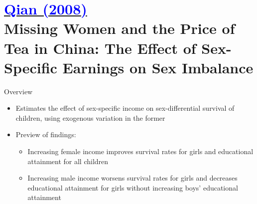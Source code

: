 \documentclass[11pt,notes=hide,aspectratio=169,mathserif]{beamer}
\begin{document}
\section*{\href{https://watermark.silverchair.com/123-3-1251.pdf?token=AQECAHi208BE49Ooan9kkhW_Ercy7Dm3ZL_9Cf3qfKAc485ysgAAA4MwggN_BgkqhkiG9w0BBwagggNwMIIDbAIBADCCA2UGCSqGSIb3DQEHATAeBglghkgBZQMEAS4wEQQM5oexR9-ezy51iFcTAgEQgIIDNvXO_WEQ2i7wsuSyrFh78JdyLp-nxQ69jjhzdxGYP3-y7cWm9HCEibHmZCw5vYxLPyLgMuYsZ4-LxYgQdiYZPK_zSeH6TFw9pInr2mJSOi2imv1wxlVSSWUiMou-Rp-U9FV6oNqdXRreflmIFwZKyFDIuFsoiN7pgwifThvGph3PMUb2qxD0UywfWjgf4rxeRPij6U49H7-Jin22nCEOW8ZTMHrRVtpVNmB4p3bwYwPzBwWfxoBwoQfd67OIvlZTpOD2C2XYpMAYjdPHyagmzHxCCTCLODnDBpEqpDls5XpdX24PJQ7H9PhBkEC4Qpa2DzDKKDZNgITi_otp491HJMc1GwAanJ-Uku_RgpBRy6cR4IG4FRZ3UCHa-Sh34UVVrOAVxZVaTTSMaE4733QHq_BeunEY17lRYOaj2zSgPpsXcvQ2L3X-bHXIIL2Sb5V0J7ZF7dXf0rI3Jl_jnPnSAxoYmVbIkyVRprv8YtB-P157Y3majgNT9RF4Cb3df1knyA1xOmLo02_a62Cl9Ye9murC4pUeU1S91DmM8dhRDO8JcN9qPyk2cekq1zjMm37TDzGEfWuOvaYZEES-jF-CAbUj8NgGULPQNLKm8rlje2vN6dEQJ8tSLncpAQHcs7qUqEyio0rnt_njur48ztBQkz8-7BowOICkn7jxg9PiVH03YrtkfezXh_WmvnB4zts9YUNcRIKpel0Z55OqPbUyr4iiXSdPTrS91JSzxMAwst5Antpju-nVDy4EGF9QITvHxsZH-VVpLRoxxQi8bdZHc_lIf6oxxMStsVnoeVX49L0EF_g5I1pazvMcPWNrjlfXGnvqELG9NvvBTHd00DGx9VK67F9T18soSQgJ8Mo1LNL8w20Ok_wY9EvFfDuYJ1GxGNPPN0u-pY-J2YFi9GI00KJ5mF6MDtkMCpikpf4zMhGdatHzfgJZO_DSxh3PMmEtQvvyfPWRfcMh7qxiOJbvuk614KWUsVNP1L7_DfQeeuN_4kOe8DdJ0DUtbsAsAtaR62L78jxemb0Ya1iLrUUbN7D9jwackNp4wZPFTfaC1_qXyHOgURoMQ_eUdI18Q1l1IGnhrZ4ZGQ}{\textcolor{blue}{Qian (2008)}} \\[5mm] 
\textnormal{\small{Missing Women and the Price of Tea in China: The Effect of Sex-Specific Earnings on Sex Imbalance}}}

\begin{frame}{Overview}
\begin{itemize}
\item Estimates the effect of sex-specific income on sex-differential survival of children, using exogenous variation in the former
\pause \item Preview of findings:
\begin{itemize}
    \pause \item Increasing female income improves survival rates for girls and educational attainment for all children
    \pause \item Increasing male income worsens survival rates for girls and decreases educational attainment for girls without increasing boys' educational attainment
\end{itemize}
\end{itemize}
\end{frame}
\end{document}
